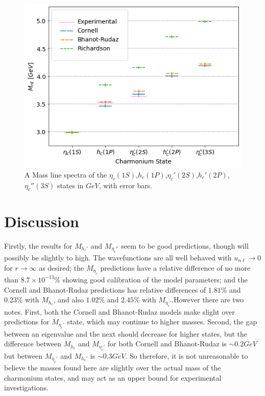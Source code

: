 \documentclass[10pt,twocolumn]{revtex4}    %
\begin{document}
\begin{figure}[!h]
    \centering
    \includegraphics[width=\linewidth]{MassLines.png}
    \caption{A Mass line spectra of the $\eta_c(1S)$,$h_c(1P)$,$\eta_c'(2S)$,$h_c'(2P)$,$\eta_c''(3S)$ states in $GeV$, with error bars.}
    \label{fig:MassLines}
\end{figure}

\section{Discussion} 

Firstly, the results for $M_{h_c'}$ and $M_{\eta_c''}$ seem to be good predictions, though will possibly be slightly to high. The wavefunctions are all well behaved with $u_{n\ell}\rightarrow 0$ for $r\rightarrow \infty$ as desired; the $M_{\eta_c}$ predictions have a relative difference of no more than $8.7\times10^{-13}\%$ showing good calibration of the model parameters; and the Cornell and Bhanot-Rudaz predictions has relative differences of $1.81\%$ and $0.23\%$ with $M_{h_c}$, and also $1.02\%$ and $2.45\%$ with $M_{\eta_c'}$.However there are two notes. First, both the Cornell and Bhanot-Rudaz models make slight over predictions for $M_{\eta_c'}$ state, which may continue to higher masses. Second, the gap between an eigenvalue and the next should decrease for higher states, but the difference between $M_{h_c}$ and $M_{\eta_c'}$ for both Cornell and Bhanot-Rudaz is $\sim 0.2GeV$ but between $M_{\eta_c'}$ and $M_{h_c'}$ is $\sim 0.3GeV$. So therefore, it is not unreasonable to believe the masses found here are slightly over the actual mass of the charmonium states, and may act as an upper bound for experimental investigations.
\end{document}

